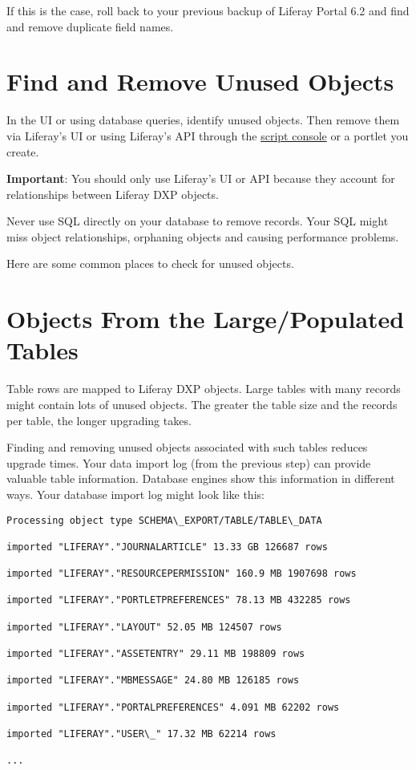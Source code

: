 If this is the case, roll back to your previous backup of Liferay Portal
6.2 and find and remove duplicate field names.

\section{Find and Remove Unused
Objects}\label{find-and-remove-unused-objects}

In the UI or using database queries, identify unused objects. Then
remove them via Liferay's UI or using Liferay's API through the
\href{/docs/7-2/user/-/knowledge_base/u/running-scripts-from-the-script-console}{script
console} or a portlet you create.

\noindent\hrulefill

\textbf{Important}: You should only use Liferay's UI or API because they
account for relationships between Liferay DXP objects.

Never use SQL directly on your database to remove records. Your SQL
might miss object relationships, orphaning objects and causing
performance problems.

\noindent\hrulefill

Here are some common places to check for unused objects.

\section{Objects From the Large/Populated
Tables}\label{objects-from-the-largepopulated-tables}

Table rows are mapped to Liferay DXP objects. Large tables with many
records might contain lots of unused objects. The greater the table size
and the records per table, the longer upgrading takes.

Finding and removing unused objects associated with such tables reduces
upgrade times. Your data import log (from the previous step) can provide
valuable table information. Database engines show this information in
different ways. Your database import log might look like this:

\begin{verbatim}
Processing object type SCHEMA\_EXPORT/TABLE/TABLE\_DATA

imported "LIFERAY"."JOURNALARTICLE" 13.33 GB 126687 rows

imported "LIFERAY"."RESOURCEPERMISSION" 160.9 MB 1907698 rows

imported "LIFERAY"."PORTLETPREFERENCES" 78.13 MB 432285 rows

imported "LIFERAY"."LAYOUT" 52.05 MB 124507 rows

imported "LIFERAY"."ASSETENTRY" 29.11 MB 198809 rows

imported "LIFERAY"."MBMESSAGE" 24.80 MB 126185 rows

imported "LIFERAY"."PORTALPREFERENCES" 4.091 MB 62202 rows

imported "LIFERAY"."USER\_" 17.32 MB 62214 rows

...
\end{verbatim}

